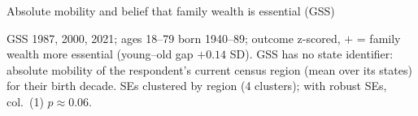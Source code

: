 \documentclass[aspectratio=169]{beamer}
\begin{document}
\begin{frame}{Absolute mobility and belief that family wealth is essential (GSS)}

\begin{table}
    \centering
    \caption*{GSS: ``How important is coming from a wealthy family for getting ahead in life?'' on absolute mobility}
    \vspace{-1.1em}
    {\tiny\setlength{\tabcolsep}{5pt}\renewcommand{\arraystretch}{0.82}
    }
\end{table}
\vspace{-0.6em}
{\tiny\centering GSS 1987, 2000, 2021; ages 18--79 born 1940--89; outcome z-scored, $+$ = family wealth more essential (young--old gap $+0.14$ SD). GSS has no state identifier: absolute mobility of the respondent's current census region (mean over its states) for their birth decade. SEs clustered by region (4 clusters); with robust SEs, col.\ (1) $p \approx 0.06$.\par}

\end{frame}



% 
% 



% 
% 
\end{document}
